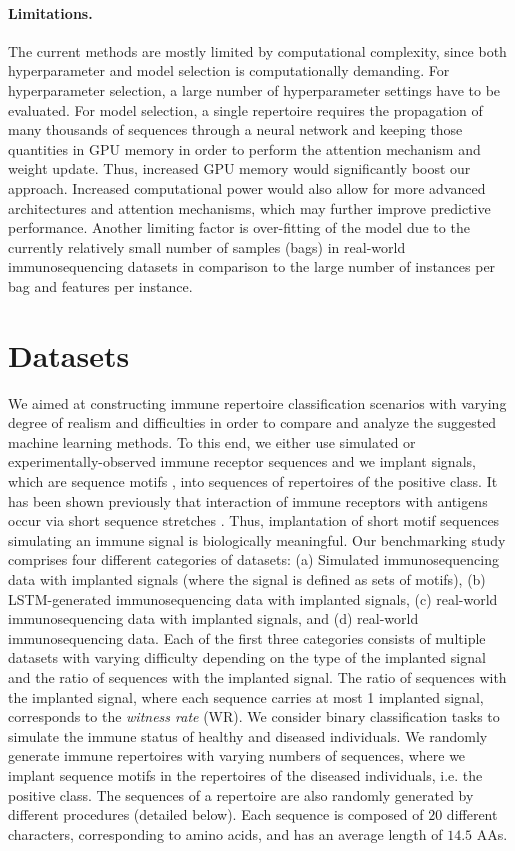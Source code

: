 \documentclass[oneside]{book}
\begin{document}
\paragraph{Limitations.}
The current methods are mostly limited by 
computational complexity, since
both hyperparameter and model selection is 
computationally demanding.
For hyperparameter selection, 
a large number of hyperparameter settings have to be evaluated. 
For model selection, a single repertoire requires 
the propagation of many thousands of sequences
through a neural network and keeping those quantities 
in GPU memory in order to perform the attention mechanism and weight update.
Thus, increased GPU memory would significantly boost 
our approach. Increased computational power would 
also allow for more advanced architectures and 
attention mechanisms, which may further improve 
predictive performance.
Another limiting factor is over-fitting of the model due to the currently relatively small number of samples (bags) in real-world immunosequencing datasets 
in comparison to the large number of instances per bag and 
features per instance.

\section{Datasets}\label{sec:datasets}
We aimed at constructing immune repertoire classification 
scenarios with varying degree of realism and 
difficulties in order to compare and analyze
the suggested machine learning methods.
To this end, we either use
simulated or experimentally-observed immune receptor sequences and we implant signals,
which are sequence motifs \citep{akbar2019compact, weber2019immunesim}, into sequences of repertoires of the positive class. It has been shown previously that interaction of immune receptors with antigens occur via short sequence stretches \citep{akbar2019compact}. Thus, implantation of short motif sequences simulating an immune signal is biologically meaningful.
Our benchmarking study comprises four different categories of datasets:
(a) Simulated immunosequencing data with implanted signals (where the signal is defined as sets of motifs), 
%
(b) LSTM-generated immunosequencing data with implanted signals,
(c) real-world immunosequencing data with implanted signals, and 
(d) real-world immunosequencing data.
Each of the first three categories consists of multiple datasets with varying 
difficulty depending on the type of the implanted signal and the ratio of sequences with the implanted signal.
The ratio of sequences with the implanted signal,
where each sequence carries at most 1 implanted signal,
corresponds to the \emph{witness rate} (WR).
We consider binary classification tasks to simulate the immune status
of healthy and diseased individuals. We randomly generate immune repertoires
with varying numbers of sequences, where we implant sequence motifs in the 
repertoires of the diseased individuals, i.e. the positive class. The sequences of a repertoire are 
also randomly generated by different procedures (detailed below).
Each sequence is composed of $20$ different characters, corresponding to amino acids, 
and has an average length of $14.5$ AAs.
%
\end{document}
